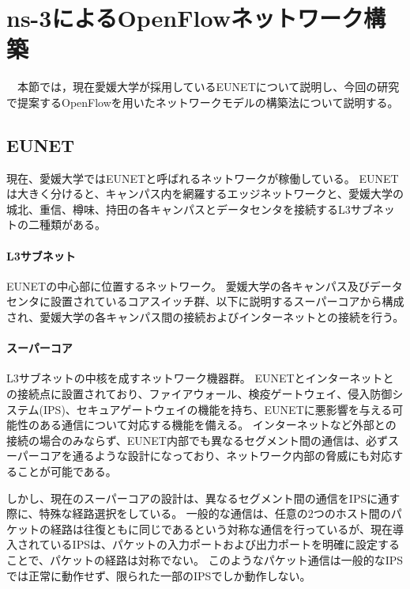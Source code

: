 \chapter{ns-3によるOpenFlowネットワーク構築}

　本節では，現在愛媛大学が採用しているEUNETについて説明し、今回の研究で提案するOpenFlowを用いたネットワークモデルの構築法について説明する。

\section{EUNET}

現在、愛媛大学ではEUNETと呼ばれるネットワークが稼働している。
EUNETは大きく分けると、キャンパス内を網羅するエッジネットワークと、愛媛大学の城北、重信、樽味、持田の各キャンパスとデータセンタを接続するL3サブネットの二種類がある。

\subsubsection{L3サブネット}

EUNETの中心部に位置するネットワーク。
愛媛大学の各キャンパス及びデータセンタに設置されているコアスイッチ群、以下に説明するスーパーコアから構成され、愛媛大学の各キャンパス間の接続およびインターネットとの接続を行う。

\subsubsection{スーパーコア}

L3サブネットの中核を成すネットワーク機器群。
EUNETとインターネットとの接続点に設置されており、ファイアウォール、検疫ゲートウェイ、侵入防御システム(IPS)、セキュアゲートウェイの機能を持ち、EUNETに悪影響を与える可能性のある通信について対応する機能を備える。
インターネットなど外部との接続の場合のみならず、EUNET内部でも異なるセグメント間の通信は、必ずスーパーコアを通るような設計になっており、ネットワーク内部の脅威にも対応することが可能である。

しかし、現在のスーパーコアの設計は、異なるセグメント間の通信をIPSに通す際に、特殊な経路選択をしている。
一般的な通信は、任意の2つのホスト間のパケットの経路は往復ともに同じであるという対称な通信を行っているが、現在導入されているIPSは、パケットの入力ポートおよび出力ポートを明確に設定することで、パケットの経路は対称でない。
このようなパケット通信は一般的なIPSでは正常に動作せず、限られた一部のIPSでしか動作しない。

